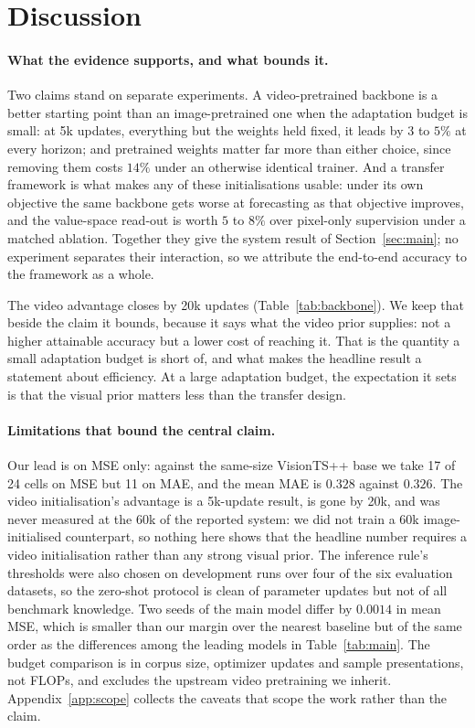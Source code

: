 \section{Discussion}
\label{sec:analysis}

\paragraph{What the evidence supports, and what bounds it.}
Two claims stand on separate experiments. A video-pretrained backbone is a better starting point than
an image-pretrained one when the adaptation budget is small: at 5k updates, everything but the
weights held fixed, it leads by $3$ to $5\%$ at every horizon; and pretrained weights matter far more
than either choice, since removing them costs $14\%$ under an otherwise identical trainer. And a transfer framework is what makes any of these initialisations
usable: under its own objective the same backbone gets worse at forecasting as that objective
improves, and the value-space read-out is worth $5$ to $8\%$ over pixel-only supervision under a
matched ablation. Together they give the system result of Section~\ref{sec:main}; no experiment
separates their interaction, so we attribute the end-to-end accuracy to the framework as a whole.

The video advantage closes by 20k updates (Table~\ref{tab:backbone}). We keep that beside the claim
it bounds, because it says what the video prior supplies: not a higher attainable accuracy but a
lower cost of reaching it. That is the quantity a small adaptation budget is short of, and what makes the
headline result a statement about efficiency. At a large adaptation budget, the expectation it sets
is that the visual prior matters less than the transfer design.

\paragraph{Limitations that bound the central claim.}
Our lead is on MSE only: against the same-size VisionTS++ base we take 17 of 24 cells on MSE but 11
on MAE, and the mean MAE is $0.328$ against $0.326$. The video initialisation's advantage is a 5k-update result, is gone by 20k, and was never measured at
the 60k of the reported system: we did not train a 60k image-initialised counterpart, so nothing here
shows that the headline number requires a video initialisation rather than any strong visual prior.
The inference rule's thresholds were also chosen on development runs over four of the six evaluation
datasets, so the zero-shot protocol is clean of parameter updates but not of all benchmark
knowledge.
Two seeds of the main model differ by $0.0014$ in mean MSE, which is smaller than our margin over the
nearest baseline but of the same order as the differences among the leading models in
Table~\ref{tab:main}. The budget comparison is in corpus size, optimizer updates and
sample presentations, not FLOPs, and excludes the upstream video pretraining we inherit. Appendix~\ref{app:scope} collects the
caveats that scope the work rather than the claim.
